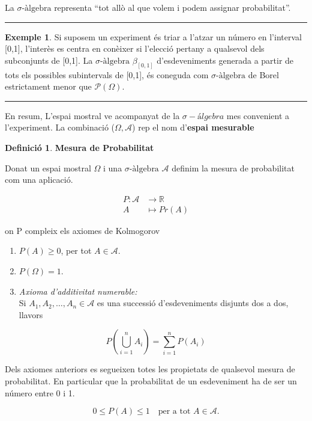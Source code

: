 \documentclass[
  catalan,
]{article}
\theoremstyle{definition}
\newtheorem{definition}{Definició}[section]
\theoremstyle{definition}
\newtheorem{example}{Exemple}[section]
\theoremstyle{definition}
\theoremstyle{definition}
\theoremstyle{remark}
\begin{document}
La \(\sigma\text{-àlgebra}\) representa ``tot allò al que volem i podem assignar probabilitat''.

\begin{center}\rule{0.5\linewidth}{0.5pt}\end{center}

\begin{example}

Si suposem un experiment és triar a l'atzar un número en l'interval {[}0,1{]}, l'interès es centra en conèixer si l'elecció pertany a qualsevol dels subconjunts de {[}0,1{]}. La \(\sigma\text{-àlgebra}\) \(\beta_{[0,1]}\) d'esdeveniments generada a partir de tots els possibles subintervals de {[}0,1{]}, és coneguda com \(\sigma\text{-àlgebra}\) de Borel estrictament menor que \(\mathcal{P}(\Omega)\).

\end{example}

\begin{center}\rule{0.5\linewidth}{0.5pt}\end{center}

En resum, L'espai mostral ve acompanyat de la \(\sigma-álgebra\) mes convenient a l'experiment. La combinació (\(\Omega,\mathcal{A}\)) rep el nom d'\textbf{espai mesurable}

\begin{definition}
\textbf{Mesura de Probabilitat}

Donat un espai mostral \(\Omega\) i una \(\sigma\text{-àlgebra}\) \(\mathcal{A}\) definim la mesura de probabilitat com una aplicació.

\[
\begin{aligned}
P : \mathcal{A} & \rightarrow \mathbb{R} \\
A &\mapsto Pr(A)
\end{aligned}
\]

on P compleix els axiomes de Kolmogorov

\begin{enumerate}
\def\labelenumi{\arabic{enumi}.}
\item
  \(P(A) \ge 0\), per tot \(A \in \mathcal{A}\).
\item
  \(P(\Omega) = 1\).
\item
  \emph{Axioma d'additivitat numerable:}\\
  Si \(A_1, A_2, \ldots, A_n\in \mathcal{A}\) es una successió d'esdeveniments disjunts dos a dos, llavors
\end{enumerate}

\[
P\left(\bigcup_{i=1}^{n} A_i \right)
=
\sum_{i=1}^{n} P(A_i)
\]

Dels axiomes anteriors es segueixen totes les propietats de qualsevol mesura
de probabilitat. En particular que la probabilitat de un esdeveniment ha de ser un número entre 0 i 1.

\[
0 \le P(A) \le 1 \quad \text{per a tot } A \in \mathcal{A}.
\]
\end{definition}
\end{document}
